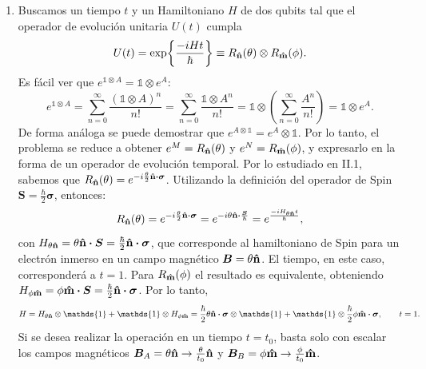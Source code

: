 \documentclass{scrartcl}
\renewcommand{\vb}[1]{\bm{#1}}
\DeclareRobustCommand{\[}{\begin{equation}}
\DeclareRobustCommand{\]}{\end{equation}}
\begin{document}
\begin{enumerate}
    \item Buscamos un tiempo $t$ y un Hamiltoniano $H$ de dos qubits tal que el operador de evolución unitaria $U(t)$ cumpla
    \[ U(t) = \exp{\frac{-iHt}{\hbar}} \equiv R_{\vu{n}}(\theta) \otimes R_{\vu{m}}(\phi). \]
    Es fácil ver que $e^{\mathds{1} \otimes A} = \mathds{1} \otimes e^A$:
    \[ e^{\mathds{1} \otimes A} = \sum_{n = 0}^\infty \frac{(\mathds{1} \otimes A)^n}{n!} = \sum_{n = 0}^\infty \frac{\mathds{1} \otimes A^n}{n!} = \mathds{1} \otimes \left( \sum_{n = 0}^\infty \frac{A^n}{n!} \right) = \mathds{1} \otimes e^A. \]
    De forma análoga se puede demostrar que $e^{A \otimes \mathds{1}} = e^A \otimes \mathds{1}$. Por lo tanto, el problema se reduce a obtener $e^M = R_{\vu{n}}(\theta)$ y $e^N = R_{\vu{m}}(\phi)$, y expresarlo en la forma de un operador de evolución temporal. Por lo estudiado en II.1, sabemos que $R_{\vu{n}}(\theta) = e^{-i \frac{\theta}{2} \vu{n} \vdot \vb{\sigma}}$. Utilizando la definición del operador de Spin $\vb{S} = \frac{\hbar}{2} \vb{\sigma}$, entonces:
    \[ R_{\vu{n}}(\theta) = e^{-i \frac{\theta}{2} \vu{n} \vdot \vb{\sigma}} = e^{-i \theta \vu{n} \vdot \frac{\vb{S}}{\hbar}} = e^{\frac{-i H_{\theta \vu{n}} t}{\hbar}}, \]
    con $H_{\theta \vu{n}} = \theta \vu{n} \vdot \vb{S} = \frac{\hbar}{2} \vu{n} \vdot \vb{\sigma}$, que corresponde al hamiltoniano de Spin para un electrón inmerso en un campo magnético $\vb{B} = \theta \vu{n}$. El tiempo, en este caso, corresponderá a $t = 1$. Para $R_{\vu{m}}(\phi)$ el resultado es equivalente, obteniendo $H_{\phi \vu{m}} = \phi \vu{m} \vdot \vb{S} = \frac{\hbar}{2} \vu{n} \vdot \vb{\sigma}$. Por lo tanto,
    \[ H = H_{\theta\vu{n}} \otimes \mathds{1} + \mathds{1} \otimes H_{\phi\vu{m}} = \frac{\hbar}{2} \theta \vu{n} \vdot \vb{\sigma} \otimes \mathds{1} + \mathds{1} \otimes \frac{\hbar}{2} \phi \vu{m} \vdot \vb{\sigma}, \quad \quad t = 1. \]
    Si se desea realizar la operación en un tiempo $t = t_0$, basta solo con escalar los campos magnéticos $\vb{B}_A = \theta \vu{n} \to \frac{\theta}{t_0} \vu{n}$ y $\vb{B}_B = \phi \vu{m} \to \frac{\phi}{t_0} \vu{m}$.
    

\end{enumerate}
\end{document}
